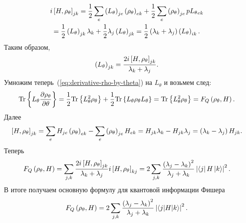 %
\begin{multline}%
  i \left[H,\rho_\theta \right]_{jk} 
  = \frac{1}{2} \sum_e \p{L_\theta }_{je}
    \p{\rho_\theta }_{ek} +
    \frac{1}{2} \sum_e \p{\rho_\theta }_{je}
    p{L_\theta }_{ek} \\
  = \frac{1}{2}\p{L_\theta }_{jk} \lambda_k 
  + \frac{1}{2}\lambda_j \p{L_\theta }_{jk}
  = \frac{1}{2} \p{\lambda_k + \lambda_j }
    \p{L_\theta }_{ik}.
\end{multline}
%
Таким образом,
\begin{equation}%
  \p{L_\theta }_{jk}
  = \frac{2i\left[H,\rho_\theta \right]_{jk}}{\lambda_k + \lambda_j}.
\end{equation}
%
Умножим теперь~(\ref{eq:derivative-rho-by-theta}) на $L_\theta$ и возьмем след:
%
\begin{equation}%
  \tr{
    L_\theta \frac{\partial \rho_\theta}{\partial \theta}
  }
  = \frac{1}{2} \tr{L^2_\theta \rho_\theta}
  + \frac{1}{2} \tr{L_\theta \rho_\theta L_\theta}
  = \tr{L^2_\theta \rho_\theta}
  = F_Q \p{\rho_\theta, H}.
\end{equation}
%
Далее
%
\begin{equation}%
  \left[H, \rho_\theta \right]_{jk} 
  = \sum_e H_{je} \p{\rho_\theta }_{ek}
  - \sum_e \p{\rho_\theta }_{je}H_{ek} 
  = H_{jk}\lambda_k - H_{jk}\lambda_j 
  = \p{\lambda_k - \lambda_j } H_{jk}.
\end{equation}
%
Теперь
%
\begin{equation}%
  F_Q \p{\rho_\theta, H } 
  = \sum_{j,k}\frac{2i\left[H,\rho_\theta \right]_{jk}}{\lambda_k + \lambda_j}
    i \left[H, \rho_\theta \right]_{kj} 
  = 2\sum_{j,k} \frac{\p{\lambda_j - \lambda_k }^2}{\lambda_j + \lambda_k}
    \abs{\bra{j} H \ket{k}}^2.
\end{equation}
%
В итоге получаем основную формулу для квантовой информации Фишера
%
\begin{equation}\label{eq:quantum-fisher-information}
        F_Q \left( \rho_\theta, H  \right) =
            2\sum_{j,k} \frac{\left( \lambda_j - \lambda_k  \right)^2}
                {\lambda_j + \lambda_k}
            \left| \langle j|H|k \rangle \right|^2.
\end{equation}

